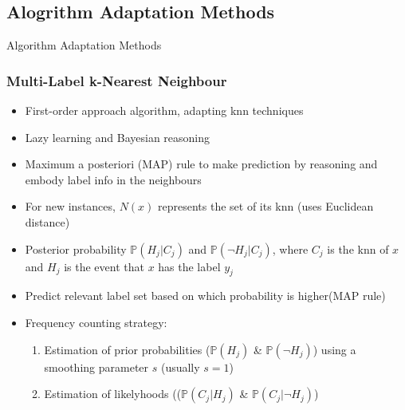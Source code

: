 \documentclass{beamer}
\begin{document}
\subsection{Alogrithm Adaptation Methods}
\begin{frame}
\Huge{\centerline{Algorithm Adaptation Methods}}
\end{frame}
\begin{frame}
\frametitle{Multi-Label k-Nearest Neighbour}
\begin{itemize}
	\item First-order approach algorithm, adapting knn techniques
	\item Lazy learning and Bayesian reasoning
	\item Maximum a posteriori (MAP) rule to make prediction by reasoning and embody label info in the neighbours
	\item For new instances, $N(x)$ represents the set of its knn (uses Euclidean distance)
	\item Posterior probability $\mathbb{P}(H_j|C_j)$ and $\mathbb{P}(\neg H_j|C_j)$, where $C_j$ is the knn of $x$ and $H_j$ is the event that $x$ has the label $y_j$
	\item Predict relevant label set based on which probability is higher(MAP rule)
	\item Frequency counting strategy:
	\begin{enumerate}
		\item Estimation of prior probabilities ($\mathbb{P}(H_j)$ \& $\mathbb{P}(\neg H_j)$) using a smoothing parameter $s$ (usually $s=1$)
		\item Estimation of likelyhoods (($\mathbb{P}(C_j|H_j)$ \& $\mathbb{P}(C_j|\neg H_j)$)
	\end{enumerate}
	
\end{itemize}
\end{frame}
\end{document}

